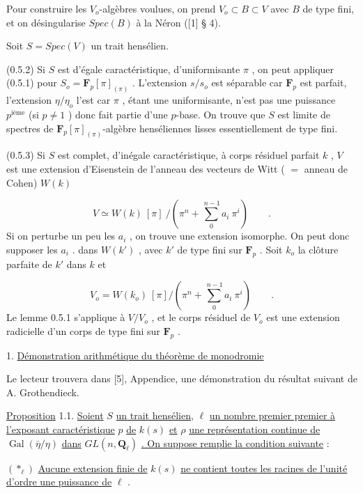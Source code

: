 Pour construire les  $V_o$-algèbres voulues, on prend  $V_o \subset B \subset V$  avec  $B$  de type fini, et on désingularise  $Spec(B)$  à la Néron  ([1]  § 4).

Soit  $S = Spec(V)$  un trait hensélien.

(0.5.2)  Si  $S$  est d'égale caractéristique, d'uniformisante  $\pi$ , on peut appliquer (0.5.1) pour  $S_o = \mathbf{F}_p[\pi]_{(\pi)}$ . L'extension  $s/s_o$  est séparable car  $\mathbf{F}_p$  est parfait, l'extension  $\eta/\eta_o$  l'est car  $\pi$ , étant une uniformisante, n'est pas une puissance  $p^{\text{ième}}$  (si  $p \neq 1$ ) donc fait partie d'une $p$-base. On trouve que  $S$  est limite de spectres de  $\mathbf{F}_p[\pi]_{(\pi)}$-algèbre henséliennes lisses essentiellement de type fini.

(0.5.3)  Si  $S$  est complet, d'inégale caractéristique, à corps résiduel parfait  $k$ , $V$  est une extension d'Eisenstein de l'anneau des vecteurs de Witt  ( $=$ anneau de Cohen)  $W(k)$

\begin{equation*}
V \simeq W(k) \ [\pi] \ /(\pi^n + \sum_0^{\,n-1} a_i \ \pi^i) \qquad .
\end{equation*}
Si on perturbe un peu les  $a_i$ , on trouve une extension isomorphe. On peut donc supposer les  $a_i$ . dans  $W(k')$ , avec  $k'$  de type fini sur  $\mathbf{F}_p$ . Soit  $k_o$  la clôture parfaite de  $k'$  dans  $k$ et

\begin{equation*}
V_o = W(k_o) \ [\pi]/(\pi^n + \sum_0^{\,n-1} a_i \ \pi^i) \qquad .
\end{equation*}
Le lemme 0.5.1 s'applique à  $V/V_o$ , et le corps résiduel de  $V_o$  est une extension radicielle d'un corps de type fini sur  $\mathbf{F}_p$  .


1.  \underline{Démonstration arithmétique du théorème de monodromie}

Le lecteur trouvera dans  [5], Appendice, une démonstration du résultat suivant de A. Grothendieck.

\underline{Proposition} 1.1.  \underline{Soient}  $S$  \underline{un trait hensélien,}  $\ell$  \underline{un nombre premier premier à l'exposant caractéristique}  $p$  \underline{de}  $k(s)$  \underline{et}  $\rho$  \underline{une représentation continue de}  $\operatorname{Gal}(\bar\eta/\eta)$  \underline{dans}  $GL(n,\mathbf{Q}_\ell)$ \underline{. On suppose remplie la condition suivante} :

$(*_\ell)$      \underline{Aucune extension finie de}  $k(s)$  \underline{ne contient toutes les racines de l'unité d'ordre une puissance de}  $\ell$ .



